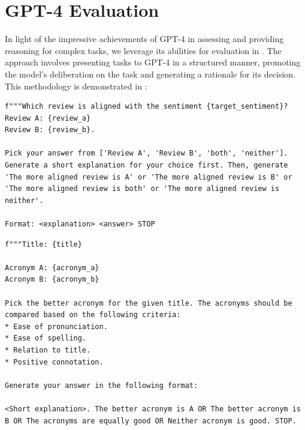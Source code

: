 
\section{GPT-4 Evaluation}
\label{sec:gpt4eval}
In light of the impressive achievements of GPT-4 in assessing and providing reasoning for complex tasks, we leverage its abilities for evaluation in \ours. 
The approach involves presenting tasks to GPT-4 in a structured manner, promoting the model's deliberation on the task and generating a rationale for its decision.
This methodology is demonstrated in :


\begin{listing}[!ht]
\begin{verbatim}
f"""Which review is aligned with the sentiment {target_sentiment}?
Review A: {review_a}
Review B: {review_b}.

Pick your answer from ['Review A', 'Review B', 'both', 'neither']. Generate a short explanation for your choice first. Then, generate 'The more aligned review is A' or 'The more aligned review is B' or 'The more aligned review is both' or 'The more aligned review is neither'.

Format: <explanation> <answer> STOP
\end{verbatim}
\caption{Prompt for GPT-4 evaluation of \sentxfer.}
\label{lst:gpt4_eval_yelp}
\end{listing}


\begin{listing}[!ht]
\begin{verbatim}
f"""Title: {title}

Acronym A: {acronym_a}
Acronym B: {acronym_b}

Pick the better acronym for the given title. The acronyms should be compared based on the following criteria:
* Ease of pronunciation.
* Ease of spelling.
* Relation to title.
* Positive connotation.

Generate your answer in the following format:

<Short explanation>. The better acronym is A OR The better acronym is B OR The acronyms are equally good OR Neither acronym is good. STOP.
\end{verbatim}
\caption{Prompt for GPT-4 evaluation of \acrogen.}
\label{lst:gpt4_eval_acro}
\end{listing}




